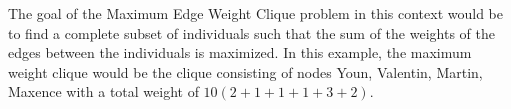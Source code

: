 The goal of the Maximum Edge Weight Clique problem in this context would be to
find a complete subset of individuals such that the sum of the weights of the
edges between the individuals is maximized. In this example, the maximum weight
clique would be the clique consisting of nodes Youn, Valentin, Martin, Maxence
with a total weight of $10(2+1+1+1+3+2)$.
